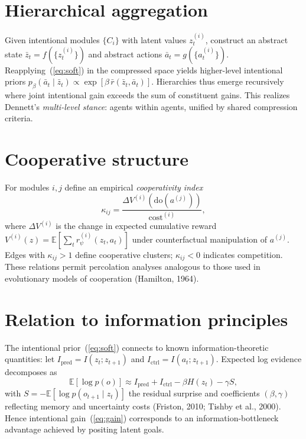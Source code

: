 \documentclass[11pt]{article}
\begin{document}
\section{Hierarchical aggregation}

Given intentional modules $\{C_i\}$ with latent values $z^{(i)}_t$,
construct an abstract state $\bar z_t=f(\{z^{(i)}_t\})$ and abstract actions $\bar a_t=g(\{a^{(i)}_t\})$.
Reapplying~(\ref{eq:soft}) in the compressed space yields higher-level intentional priors
$p_\beta(\bar a_t\mid\bar z_t)\!\propto\!\exp[\beta\,\bar r(\bar z_t,\bar a_t)]$.
Hierarchies thus emerge recursively where joint intentional gain exceeds the sum of constituent gains.
This realizes Dennett’s \emph{multi-level stance}: agents within agents, unified by shared compression criteria.

\section{Cooperative structure}

For modules $i,j$ define an empirical \emph{cooperativity index}
\begin{equation}
\kappa_{ij}
=\frac{\Delta V^{(i)}( \text{do}(a^{(j)}) )}
      {\mathrm{cost}^{(i)}},
\label{eq:kappa}
\end{equation}
where $\Delta V^{(i)}$ is the change in expected cumulative reward
$V^{(i)}(z)=\mathbb E[\sum_t r_\psi^{(i)}(z_t,a_t)]$
under counterfactual manipulation of $a^{(j)}$.
Edges with $\kappa_{ij}>1$ define cooperative clusters;
$\kappa_{ij}<0$ indicates competition.
These relations permit percolation analyses analogous to those used in evolutionary models of cooperation
(Hamilton, 1964).

\section{Relation to information principles}

The intentional prior~(\ref{eq:soft}) connects to known information-theoretic quantities:
let $I_{\mathrm{pred}}=I(z_t;z_{t+1})$ and
$I_{\mathrm{ctrl}}=I(a_t;z_{t+1})$.
Expected log evidence decomposes as
\begin{equation}
\mathbb E[\log p(o)]\approx
I_{\mathrm{pred}}+I_{\mathrm{ctrl}}
-\beta H(z_t)-\gamma S,
\end{equation}
with $S=-\mathbb E[\log p(o_{t+1}\mid z_t)]$ the residual surprise
and coefficients $(\beta,\gamma)$ reflecting memory and uncertainty costs
(Friston, 2010; Tishby et al., 2000).
Hence intentional gain~(\ref{eq:gain}) corresponds to an information-bottleneck advantage achieved by positing latent goals.
\end{document}

